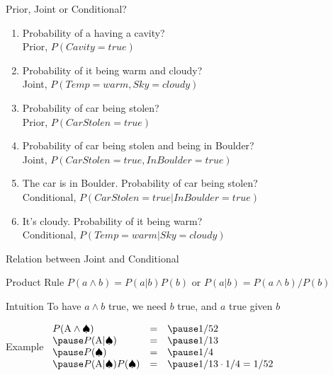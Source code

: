 \documentclass[14pt]{beamer}
\begin{document}
\begin{frame}{Prior, Joint or Conditional?}
\begin{enumerate}
\item Probability of a having a cavity? \\
\pause Prior, $P(\textit{Cavity}=\textit{true})$
\pause
\item Probability of it being warm and cloudy? \\
\pause Joint, $P(\textit{Temp}=\textit{warm}, \textit{Sky}=\textit{cloudy})$
\pause
\item Probability of car being stolen? \\
\pause Prior, $P(\textit{CarStolen}=\textit{true})$
\pause
\item Probability of car being stolen and being in Boulder? \\
\pause Joint, $P(\textit{CarStolen}=\textit{true}, \textit{InBoulder}=\textit{true})$
\pause
\item The car is in Boulder. Probability of car being stolen? \\
\pause Conditional, $P(\textit{CarStolen}=\textit{true}|\textit{InBoulder}=\textit{true})$
\pause
\item It's cloudy. Probability of it being warm? \\
\pause Conditional, $P(\textit{Temp}=\textit{warm}| \textit{Sky}=\textit{cloudy})$
\end{enumerate}
\end{frame}

\begin{frame}{Relation between Joint and Conditional}
\begin{block}{Product Rule}
$P(a \land b) = P(a|b)P(b)$ \hfill or \hfill $P(a|b) = P(a \land b)/P(b)$
\end{block}
\pause
\begin{block}{Intuition}
To have $a \land b$ true, we need $b$ true, and $a$ true given $b$
\end{block}
\pause
\begin{block}{Example}
$
\begin{array}{lll}
P(\mbox{A} \land \spadesuit) & = & \pause 1/52 \\
\pause
P(\mbox{A}|\spadesuit) & = & \pause 1/13 \\
\pause
P(\spadesuit) & = & \pause 1/4  \\
\pause
P(\mbox{A}|\spadesuit)P(\spadesuit) & = & \pause 1/13 \cdot 1/4 = 1/52 \\
\end{array}
$
\end{block}
\end{frame}
\end{document}
